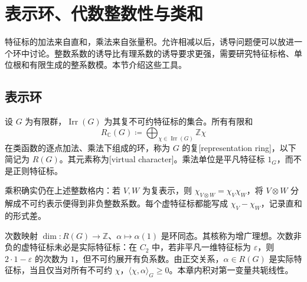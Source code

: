 
\section{表示环、代数整数性与类和}
\label{b5:sec:0501}

特征标的加法来自直和，乘法来自张量积。允许相减以后，诱导问题便可以放进一个环中讨论。整数系数的诱导比有理系数的诱导要求更强，需要研究特征标格、单位根和有限生成的整系数模。本节介绍这些工具。

\subsection{表示环}
\label{b5:subsec:0501:01}

\begin{definition}\label{b5:def:complex-representation-ring}
	设 \(G\) 为有限群，\(\operatorname{Irr}(G)\) 为其复不可约特征标的集合。所有有限和
	\[
		R_{\mathbb C}(G)\coloneqq \bigoplus_{\chi\in\operatorname{Irr}(G)}\mathbb Z\chi
	\]
	在类函数的逐点加法、乘法下组成的环，称为 \(G\) 的复[representation ring]，以下简记为 \(R(G)\)。其元素称为[virtual character]。乘法单位是平凡特征标 \(1_G\)，而不是正则特征标。
\end{definition}

乘积确实仍在上述整数格内：若 \(V,W\) 为复表示，则 \(\chi_{V\otimes W}=\chi_V\chi_W\)，将 \(V\otimes W\) 分解成不可约表示便得到非负整数系数。每个虚特征标都能写成 \(\chi_V-\chi_W\)，记录直和的形式差。

\ProseParagraphBreak
次数映射 \(\dim:R(G)\rightarrow\mathbb Z\)、\(\alpha\mapsto\alpha(1)\) 是环同态。其核称为增广理想。次数非负的虚特征标未必是实际特征标：在 \(C_2\) 中，若非平凡一维特征标为 \(\varepsilon\)，则 \(2\cdot1-\varepsilon\) 的次数为 \(1\)，但不可约展开有负系数。由正交关系，\(\alpha\in R(G)\) 是实际特征标，当且仅当对所有不可约 \(\chi\)，\(\langle\chi,\alpha\rangle_G\ge0\)。本章内积对第一变量共轭线性。

